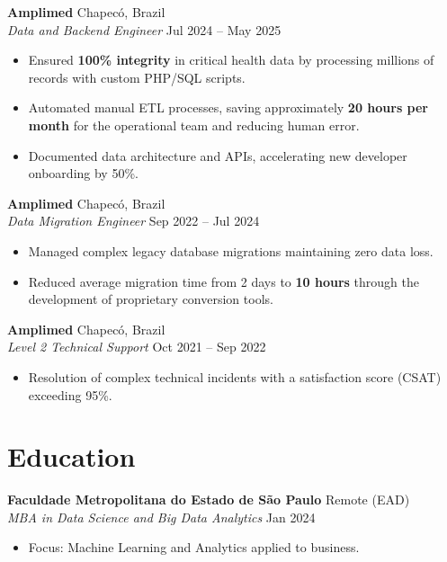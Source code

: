 \documentclass[a4paper,10pt]{article}
\begin{document}
\vspace{3pt}

\noindent \textbf{Amplimed} \hfill Chapecó, Brazil \\
\textit{Data and Backend Engineer} \hfill Jul 2024 -- May 2025
\begin{itemize}[noitemsep, topsep=2pt]
    \item Ensured \textbf{100\% integrity} in critical health data by processing millions of records with custom PHP/SQL scripts.
    \item Automated manual ETL processes, saving approximately \textbf{20 hours per month} for the operational team and reducing human error.
    \item Documented data architecture and APIs, accelerating new developer onboarding by 50\%.
\end{itemize}

\vspace{3pt}

\noindent \textbf{Amplimed} \hfill Chapecó, Brazil \\
\textit{Data Migration Engineer} \hfill Sep 2022 -- Jul 2024
\begin{itemize}[noitemsep, topsep=2pt]
    \item Managed complex legacy database migrations maintaining zero data loss.
    \item Reduced average migration time from 2 days to \textbf{10 hours} through the development of proprietary conversion tools.
\end{itemize}

\vspace{3pt}

\noindent \textbf{Amplimed} \hfill Chapecó, Brazil \\
\textit{Level 2 Technical Support} \hfill Oct 2021 -- Sep 2022
\begin{itemize}[noitemsep, topsep=2pt]
    \item Resolution of complex technical incidents with a satisfaction score (CSAT) exceeding 95\%.
\end{itemize}

\section{Education}

\noindent \textbf{Faculdade Metropolitana do Estado de São Paulo} \hfill Remote (EAD) \\
\textit{MBA in Data Science and Big Data Analytics} \hfill Jan 2024
\begin{itemize}[noitemsep, topsep=0pt]
    \item Focus: Machine Learning and Analytics applied to business.
\end{itemize}
\end{document}
